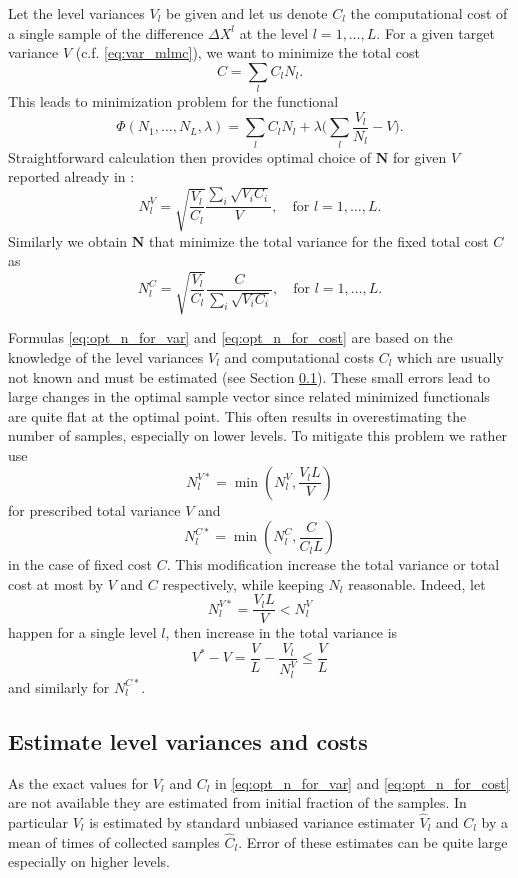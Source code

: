 \documentclass{article}
\def\vc#1{\mathbf{\boldsymbol{#1}}}     %
\begin{document}
Let  the level variances $V_l$ be given and let us denote $C_l$ the computational cost of a single sample of the difference $\Delta X^l$ at the level $l=1,\dots, L$. For a given target variance $V$ (c.f. \eqref{eq:var_mlmc}), we want to minimize the total cost
\begin{equation}
    \label{eq:total_cost}
	C = \sum_l C_l N_l.
\end{equation}
This leads to minimization problem for the functional
\[
	\Phi(N_1, \dots, N_L,\lambda) = \sum_l C_l N_l + \lambda \Big(\sum_l \frac{V_l}{N_l} - V\Big).
\]
Straightforward calculation then provides optimal choice of $\vc N$ for given $V$ reported already in \cite{Giles2015}:
\begin{equation}
	\label{eq:opt_n_for_var}
	N_l^V = \sqrt{\frac{V_l}{C_l}} \frac{\sum_i \sqrt{V_i C_i}}{V}, \quad \text{for }l=1,\dots, L.
\end{equation}
Similarly we obtain $\vc N$ that minimize the total variance for the fixed total cost $C$ as
\begin{equation}
	\label{eq:opt_n_for_cost}
	N_l^C = \sqrt{\frac{V_l}{C_l}} \frac{C}{\sum_i \sqrt{V_i C_i}}
	, \quad \text{for }l=1,\dots, L.
\end{equation}

Formulas \eqref{eq:opt_n_for_var} and \eqref{eq:opt_n_for_cost} are based on the knowledge of the level variances $V_l$ and computational costs $C_l$ which are usually not known and must be estimated (see Section \ref{sec:VarEst}). These small errors lead to large changes in the optimal sample vector since related minimized functionals are quite flat at the optimal point.  This often results in overestimating the number of samples, especially on lower levels. To mitigate this problem we rather use
\[
	N_l^{V*} = \min( N_l^V, \frac{V_l L}{V} )
\]
for prescribed total variance $V$ and
\[
	N_l^{C*} = \min( N_l^C, \frac{C}{C_l L} )
\]
in the case of fixed cost $C$. This modification increase the total variance or total cost at most by $V$ and $C$ respectively, while keeping  $N_l$ reasonable. Indeed, let
\[
	N_l^{V*} = \frac{V_l L}{V} < N_l^V 
\]
happen for a single level $l$, then increase in the total variance is
\[
    V^* - V = \frac{V}{L} - \frac{V_l}{N_l^V} \le \frac{V}{L}
\]
and similarly for $N_l^{C*}$.



\subsection{Estimate level variances and costs}
\label{sec:VarEst}
As the exact values for $V_l$ and $C_l$ in \eqref{eq:opt_n_for_var} and \eqref{eq:opt_n_for_cost} are not available they are estimated from initial fraction of the samples. In particular $V_l$ is estimated by standard unbiased variance estimater $\widehat V_l$ and $C_l$ by a mean of times of collected samples 
$\widehat C_l$. Error of these estimates can be quite large especially on higher levels. 
\end{document}
